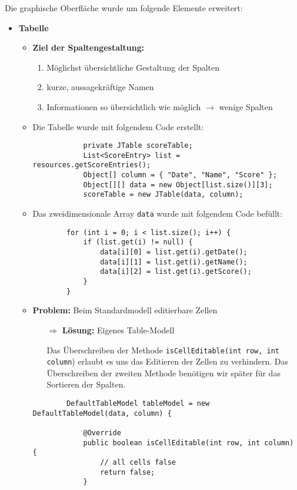 Die graphische Oberfläche wurde um folgende Elemente erweitert:
\begin{itemize}
	\item  \textbf{Tabelle}
		\begin{itemize}
		\item \textbf{Ziel der Spaltengestaltung:}
			\begin{enumerate}
			\item Möglichst übersichtliche Gestaltung der Spalten
			\item kurze, aussagekräftige Namen
			\item Informationen so übersichtlich wie möglich $\rightarrow$ wenige Spalten
			\end{enumerate}
		\item Die Tabelle wurde mit folgendem Code erstellt:
		\begin{lstlisting}
			private JTable scoreTable;
			List<ScoreEntry> list = resources.getScoreEntries();
			Object[] column = { "Date", "Name", "Score" };
			Object[][] data = new Object[list.size()][3];
			scoreTable = new JTable(data, column);	
		\end{lstlisting} 
		
		\item Das zweidimensionale Array \texttt{data} wurde mit folgendem Code befüllt:
		\begin{lstlisting}
		for (int i = 0; i < list.size(); i++) {
			if (list.get(i) != null) {
				data[i][0] = list.get(i).getDate();
				data[i][1] = list.get(i).getName();
				data[i][2] = list.get(i).getScore();
			}
		}
		\end{lstlisting}
		
		\item \textbf{Problem:} Beim Standardmodell editierbare Zellen
			\begin{itemize}
				\item[$\Rightarrow$] \textbf{Lösung:} Eigenes Table-Modell
				\item[]
						Das Überschreiben der Methode \texttt{isCellEditable(int row, int column}) erlaubt es 
						uns das Editieren der Zellen zu verhindern. Das Überschreiben der zweiten Methode
						benötigen wir später für das Sortieren der Spalten.
			\end{itemize}
	
		\begin{lstlisting}
		DefaultTableModel tableModel = new DefaultTableModel(data, column) {

			@Override
			public boolean isCellEditable(int row, int column) {
				// all cells false
				return false;
			}


\end{lstlisting}
\end{itemize}
\end{itemize}
